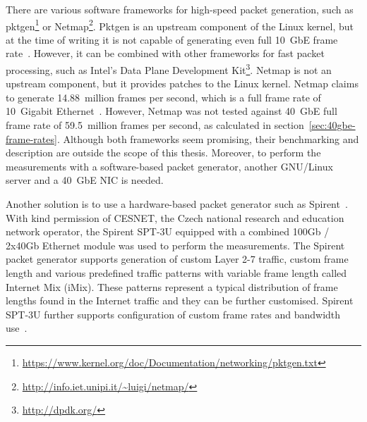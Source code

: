 There are various software frameworks for high-speed packet generation,
such as pktgen\footnote{\url{https://www.kernel.org/doc/Documentation/networking/pktgen.txt}}
or Netmap\footnote{\url{http://info.iet.unipi.it/~luigi/netmap/}}.
Pktgen is an upstream component of the Linux kernel, but
at the time of writing it is not capable of generating even full 10~GbE frame rate~\cite{netmap}.
However, it can be combined with other frameworks for fast packet processing, such as
Intel's Data Plane Development Kit\footnote{\url{http://dpdk.org/}}.
Netmap is not an upstream component, but it provides patches to the Linux kernel.
Netmap claims to generate 14.88~million frames per second, which is a full frame rate of 10~Gigabit Ethernet~\cite{netmap}.
However, Netmap was not tested against 40~GbE full frame rate of 59.5~million frames per second,
as calculated in section~\ref{sec:40gbe-frame-rates}.
Although both frameworks seem promising, their benchmarking and description
are outside the scope of this thesis.
Moreover, to perform the measurements with a software-based packet generator,
another GNU/Linux server and a 40~GbE NIC is needed.

Another solution is to use a hardware-based packet generator such as Spirent~\cite{spirent}.
With kind permission of CESNET, the Czech national research and education network operator,
the Spirent SPT-3U equipped with a combined 100Gb / 2x40Gb Ethernet module was used to perform the measurements.
The Spirent packet generator supports generation of custom Layer 2-7 traffic, custom frame length and various
predefined traffic patterns with variable frame length called Internet Mix (iMix).
These patterns represent a typical distribution of frame lengths found in the Internet traffic
and they can be further customised.
Spirent SPT-3U further supports configuration of custom frame rates and bandwidth use~\cite{spirent}.
